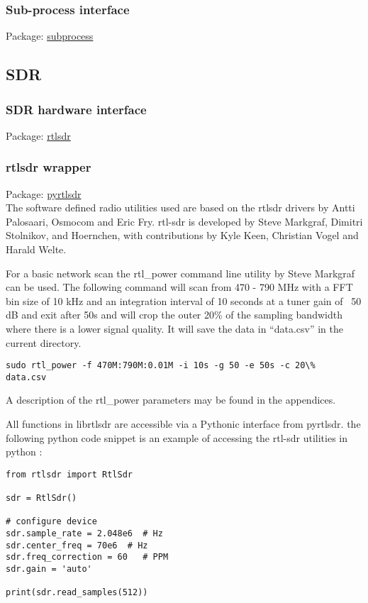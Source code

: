 \subsubsection{Sub-process interface}
Package:	\href{https://docs.python.org/2/library/subprocess.html}{subprocess}\\

\subsection{SDR}
\subsubsection{SDR hardware interface}
Package:	\href{https://github.com/steve-m/librtlsdr}{rtlsdr}\\

\subsubsection{rtlsdr wrapper}
Package:	\href{https://github.com/roger-/pyrtlsdr}{pyrtlsdr}\\
The software defined radio utilities used are based on the rtlsdr drivers by Antti Palosaari, Osmocom and Eric Fry. rtl-sdr is developed by Steve Markgraf, Dimitri Stolnikov, and Hoernchen, with contributions by Kyle Keen, Christian Vogel and Harald Welte.

For a basic network scan the rtl\_power command line utility by Steve Markgraf can be used. The following command will scan from 470 - 790 MHz with a FFT bin size of 10 kHz and an integration interval of 10 seconds at a tuner gain of ~50 dB and exit after 50s and will crop the outer 20\% of the sampling bandwidth where there is a lower signal quality. It will save the data in “data.csv” in the current directory.
\begin{lstlisting}
sudo rtl_power -f 470M:790M:0.01M -i 10s -g 50 -e 50s -c 20\%  data.csv
\end{lstlisting}

A description of the rtl_power parameters may be found in the appendices.

All functions in librtlsdr are accessible via a Pythonic interface from pyrtlsdr.
the following python code snippet is an example of accessing the rtl-sdr utilities in python :

\begin{lstlisting}
from rtlsdr import RtlSdr

sdr = RtlSdr()

# configure device
sdr.sample_rate = 2.048e6  # Hz
sdr.center_freq = 70e6 	# Hz
sdr.freq_correction = 60   # PPM
sdr.gain = 'auto'

print(sdr.read_samples(512))
\end{lstlisting}

